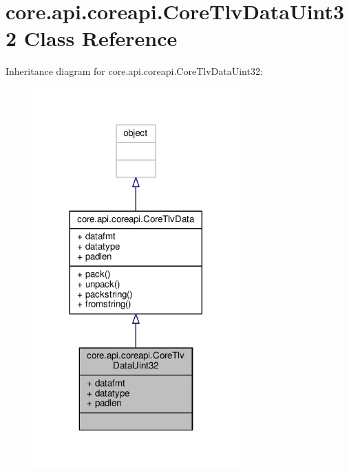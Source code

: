 \hypertarget{classcore_1_1api_1_1coreapi_1_1_core_tlv_data_uint32}{\section{core.\+api.\+coreapi.\+Core\+Tlv\+Data\+Uint32 Class Reference}
\label{classcore_1_1api_1_1coreapi_1_1_core_tlv_data_uint32}
}


Inheritance diagram for core.\+api.\+coreapi.\+Core\+Tlv\+Data\+Uint32\+:
\nopagebreak
\begin{figure}[H]
\begin{center}
\leavevmode
\includegraphics[width=224pt]{classcore_1_1api_1_1coreapi_1_1_core_tlv_data_uint32__inherit__graph}
\end{center}
\end{figure}


